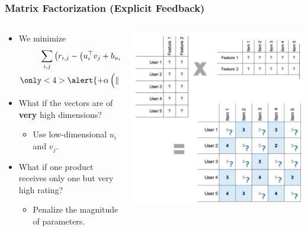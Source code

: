 \documentclass[11pt]{beamer}
\begin{document}
	\begin{frame}
		\frametitle{Matrix Factorization (Explicit Feedback)}
		\begin{columns}
			\begin{column}{0.6\textwidth}
				\begin{itemize}
					\item<1-> We minimize
					$$
					\begin{gathered}
					\sum_{i,j}\left(r_{i,j} -
					\left(u_i^\top v_j + b_{u_i} + b_{u_j}\right)
					\right)^2 \\
					\only<4>{\alert{+ \alpha\left(
							\left\lVert U \right\rVert_F^2 + 
							\left\lVert V \right\rVert_F^2
							\right)}}
					\end{gathered}
					$$
					\item<1-> What if the vectors are of \textbf{very} high dimensions?
					\begin{itemize}
						\item<2-> Use low-dimensional $u_i$ and $v_j$.
					\end{itemize}
					\item<3-> What if one product receives only one but very high rating?
					\begin{itemize}
						\item<4-> Penalize the magnitude of parameters.
					\end{itemize}
				\end{itemize}
			\end{column}
			\begin{column}{0.4\textwidth}
				\begin{center}
					\centering
					\includegraphics[width=\textwidth]{images/matrix_factorization.png}
					

\end{center}
\end{column}
\end{columns}
\end{frame}
\end{document}
